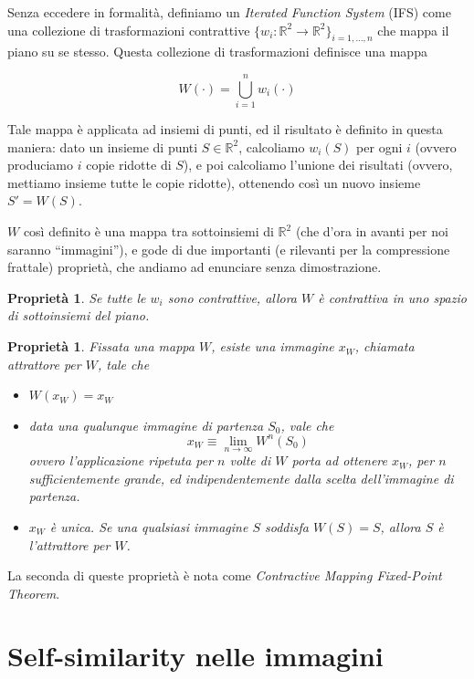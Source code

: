 \documentclass[11pt,a4paper,appendixprefix=true,numbers=noenddot]{scrreprt}
\newtheorem{proprieta}[teorema]{Proprietà}
\begin{document}
Senza eccedere in formalità, definiamo un \emph{Iterated Function System} (IFS) come una collezione di trasformazioni contrattive $\{w_i : \mathbb{R}^2 \rightarrow \mathbb{R}^2 \}_{i=1,\ldots, n}$ che mappa il piano su se stesso. Questa collezione di trasformazioni definisce una mappa 

\[
W(\cdot) = \bigcup_{i=1}^{n} w_i(\cdot)
\]

Tale mappa è applicata ad insiemi di punti, ed il risultato è definito in questa maniera: dato un insieme di punti $S \in \mathbb{R}^2$, calcoliamo $w_i(S)$ per ogni $i$ (ovvero produciamo $i$ copie ridotte di $S$), e poi calcoliamo l'unione dei risultati (ovvero, mettiamo insieme tutte le copie ridotte), ottenendo così un nuovo insieme $S' = W(S)$.

$W$ così definito è una mappa tra sottoinsiemi di $\mathbb{R}^2$ (che d'ora in avanti per noi saranno ``immagini''), e gode di due importanti (e rilevanti per la compressione frattale) proprietà, che andiamo ad enunciare senza dimostrazione.

\begin{proprieta}
Se tutte le $w_i$ sono contrattive, allora $W$ è contrattiva in uno spazio di sottoinsiemi del piano.
\end{proprieta}

\begin{proprieta}
Fissata una mappa $W$, esiste una immagine $x_W$, chiamata \emph{attrattore per $W$}, tale che
\begin{itemize}
\item $W(x_W) = x_W$
\item data una qualunque immagine di partenza $S_0$, vale che 
\[x_W \equiv \lim_{n \rightarrow \infty} W^{n}(S_0) \]
ovvero l'applicazione ripetuta per $n$ volte di $W$ porta ad ottenere $x_W$, per $n$ sufficientemente grande, ed indipendentemente dalla scelta dell'immagine di partenza.
\item $x_W$ è unica. Se una qualsiasi immagine $S$ soddisfa $W(S) = S$, allora $S$ è l'attrattore per $W$.
\end{itemize}
\end{proprieta}

La seconda di queste proprietà è nota come \emph{Contractive Mapping Fixed-Point Theorem}.

\section{Self-similarity nelle immagini}
\end{document}
